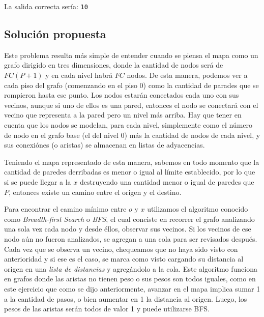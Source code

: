         La salida correcta sería: \newline
        \texttt{10}

    \subsection{Solución propuesta}
        Este problema resulta más simple de entender cuando se piensa el mapa como un grafo dirigido en tres dimensiones, donde la cantidad de nodos será de $FC(P+1)$ y en cada nivel habrá $FC$ nodos. De esta manera, podemos ver a cada piso del grafo (comenzando en el piso 0) como la cantidad de parades que se rompieron hasta ese punto. Los nodos estarán conectados cada uno con sus vecinos, aunque si uno de ellos es una pared, entonces el nodo se conectará con el vecino que representa a la pared pero un nivel más arriba. Hay que tener en cuenta que los nodos se modelan, para cada nivel, simplemente como el número de nodo en el grafo base (el del nivel 0) más la cantidad de nodos de cada nivel, y sus conexiónes (o aristas) se almacenan en listas de adyacencias.

        Teniendo el mapa representado de esta manera, sabemos en todo momento que la cantidad de paredes derribadas es menor o igual al límite establecido, por lo que si se puede llegar a la $x$ destruyendo una cantidad menor o igual de paredes que $P$, entonces existe un camino entre el origen y el destino.

        Para encontrar el camino mínimo entre $o$ y $x$ utilizamos el algoritmo conocido como \textit{Breadth-first Search} o \textit{BFS}, el cual conciste en recorrer el grafo analizando una sola vez cada nodo y desde éllos, observar sus vecinos. Si los vecinos de ese nodo aún no fueron analizados, se agregan a una cola para ser revisados después. Cada vez que se observa un vecino, chequeamos que no haya sido visto con anterioridad y si ese es el caso, se marca como visto cargando su distancia al origen en una \textit{lista de distancias} y agregándolo a la cola. Este algoritmo funciona en grafos donde las aristas no tienen peso o sus pesos son todos iguales, como en este ejercicio que como se dijo anteriormente, avanzar en el mapa implica sumar 1 a la cantidad de pasos, o bien aumentar en 1 la distancia al origen. Luego, los pesos de las aristas serán todos de valor 1 y puede utilizarse BFS.

